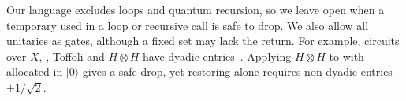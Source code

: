 \documentclass[acmsmall,11pt,screen,review,anonymous,nonacm]{acmart}
\begin{document}
Our language excludes loops and quantum recursion, so we leave open when a temporary used in a loop or
recursive call is safe to drop.
We also allow all unitaries as gates, although a fixed set may lack the return.
For example, circuits over $X$, , Toffoli and $H\otimes H$ have dyadic
entries~\cite[Cor.~5.6]{Amy2020Restricted}. Applying $H\otimes H$ to  with  allocated
in $|0\rangle$ gives a safe drop, yet restoring  alone requires non-dyadic entries $\pm1/\sqrt2$.

\clearpage
{}


\end{document}
